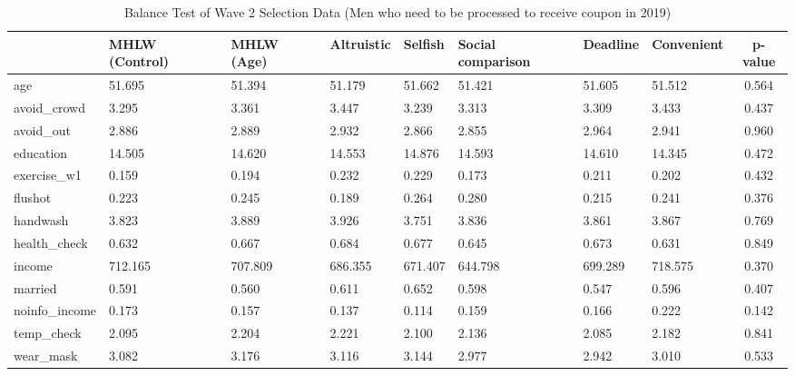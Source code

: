 \begin{table}[!h]

\caption{Balance Test of Wave 2 Selection Data (Men who need to be processed to receive coupon in 2019) \label{tab:act-coupon0-balance}}
\centering
\begin{tabular}[t]{l>{\centering\arraybackslash}p{3em}>{\centering\arraybackslash}p{3em}>{\centering\arraybackslash}p{3em}>{\centering\arraybackslash}p{3em}>{\centering\arraybackslash}p{3em}>{\centering\arraybackslash}p{3em}>{\centering\arraybackslash}p{3em}c}
\toprule
  & MHLW (Control) & MHLW (Age) & Altruistic & Selfish & Social comparison & Deadline & Convenient & p-value\\
\midrule
age & \num{51.695} & \num{51.394} & \num{51.179} & \num{51.662} & \num{51.421} & \num{51.605} & \num{51.512} & \num{0.564}\\
avoid\_crowd & \num{3.295} & \num{3.361} & \num{3.447} & \num{3.239} & \num{3.313} & \num{3.309} & \num{3.433} & \num{0.437}\\
avoid\_out & \num{2.886} & \num{2.889} & \num{2.932} & \num{2.866} & \num{2.855} & \num{2.964} & \num{2.941} & \num{0.960}\\
education & \num{14.505} & \num{14.620} & \num{14.553} & \num{14.876} & \num{14.593} & \num{14.610} & \num{14.345} & \num{0.472}\\
exercise\_w1 & \num{0.159} & \num{0.194} & \num{0.232} & \num{0.229} & \num{0.173} & \num{0.211} & \num{0.202} & \num{0.432}\\
flushot & \num{0.223} & \num{0.245} & \num{0.189} & \num{0.264} & \num{0.280} & \num{0.215} & \num{0.241} & \num{0.376}\\
handwash & \num{3.823} & \num{3.889} & \num{3.926} & \num{3.751} & \num{3.836} & \num{3.861} & \num{3.867} & \num{0.769}\\
health\_check & \num{0.632} & \num{0.667} & \num{0.684} & \num{0.677} & \num{0.645} & \num{0.673} & \num{0.631} & \num{0.849}\\
income & \num{712.165} & \num{707.809} & \num{686.355} & \num{671.407} & \num{644.798} & \num{699.289} & \num{718.575} & \num{0.370}\\
married & \num{0.591} & \num{0.560} & \num{0.611} & \num{0.652} & \num{0.598} & \num{0.547} & \num{0.596} & \num{0.407}\\
noinfo\_income & \num{0.173} & \num{0.157} & \num{0.137} & \num{0.114} & \num{0.159} & \num{0.166} & \num{0.222} & \num{0.142}\\
temp\_check & \num{2.095} & \num{2.204} & \num{2.221} & \num{2.100} & \num{2.136} & \num{2.085} & \num{2.182} & \num{0.841}\\
wear\_mask & \num{3.082} & \num{3.176} & \num{3.116} & \num{3.144} & \num{2.977} & \num{2.942} & \num{3.010} & \num{0.533}\\
\bottomrule
\end{tabular}
\end{table}
